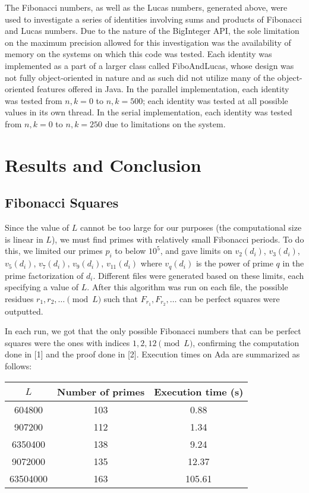 \documentclass[11pt]{article}
\begin{document}
The Fibonacci numbers, as well as the Lucas numbers, generated above, were used to investigate a series of identities involving sums and products of Fibonacci and Lucas numbers. Due to the nature of the BigInteger API, the sole limitation on the maximum precision allowed for this investigation was the availability of memory on the systems on which this code was tested. Each identity was implemented as a part of a larger class called FiboAndLucas, whose design was not fully object-oriented in nature and as such did not utilize many of the object-oriented features offered in Java. In the parallel implementation, each identity was tested from $n, k = 0$ to $n, k = 500$; each identity was tested at all possible values in its own thread. In the serial implementation, each identity was tested from $n,k = 0$ to $n,k = 250$ due to limitations on the system.


\section{Results and Conclusion}

\subsection{Fibonacci Squares}
Since the value of $L$ cannot be too large for our purposes (the computational size is linear in $L$), we must find primes with relatively small Fibonacci periods. To do this, we limited our primes $p_i$ to below $10^5$, and gave limits on $v_2(d_i)$, $v_3(d_i)$, $v_5(d_i)$, $v_7(d_i)$, $v_9(d_i)$, $v_{11}(d_i)$ where $v_q(d_i)$ is the power of prime $q$ in the prime factorization of $d_i$. Different files were generated based on these limits, each specifying a value of $L$. After this algorithm was run on each file, the possible residues $r_1, r_2, \dots \pmod L$ such that $F_{r_1}, F_{r_2}, \dots$ can be perfect squares were outputted.

In each run, we got that the only possible Fibonacci numbers that can be perfect squares were the ones with indices $1, 2, 12 \pmod{L}$, confirming the computation done in [1] and the proof done in [2]. Execution times on Ada are summarized as follows:
\vspace{.1in}

\begin{center}
\begin{tabular}{ccc}
\hline
$L$ & Number of primes & Execution time (s) \\ \hline
604800 & 103 & 0.88 \\
907200 & 112 & 1.34 \\
6350400 & 138 & 9.24 \\
9072000 & 135 & 12.37 \\
63504000 & 163 & 105.61 \\ \hline \hline
\end{tabular}
\end{center}
\end{document}
